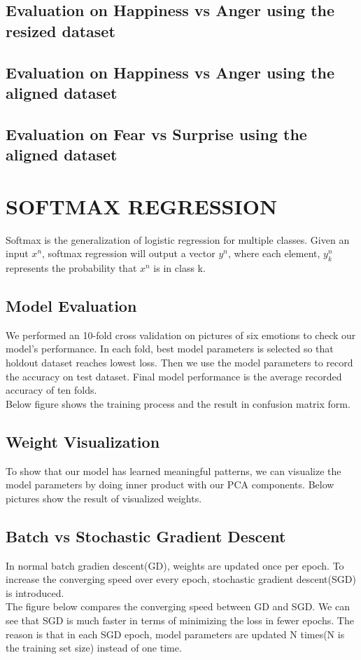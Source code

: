 \documentclass{article} %
\begin{document}
\subsection {Evaluation on Happiness vs Anger using the resized dataset}
\subsection {Evaluation on Happiness vs Anger using the aligned dataset}
\subsection {Evaluation on Fear vs Surprise using the aligned dataset}


\section{SOFTMAX REGRESSION}
Softmax is the generalization of logistic regression for multiple classes. Given an input $x^n$, softmax regression will output a vector $y^n$, where each element, $y_k^n$ represents the probability that $x^n$ is in class k.
\subsection {Model Evaluation}
We performed an 10-fold cross validation on pictures of six emotions to check our model's performance. In each fold, best model parameters is selected so that holdout dataset reaches lowest loss. Then we use the model parameters to record the accuracy on test dataset. Final model performance is the average recorded accuracy of ten folds. \\
Below figure shows the training process and the result in confusion matrix form.
\subsection {Weight Visualization}
To show that our model has learned meaningful patterns, we can visualize the model parameters by doing inner product with our PCA components. Below pictures show the result of visualized weights. 
\subsection {Batch vs Stochastic Gradient Descent}
In normal batch gradien descent(GD), weights are updated once per epoch. To increase the converging speed over every epoch, stochastic gradient descent(SGD) is introduced.\\
The figure below compares the converging speed between GD and SGD. We can see that SGD is much faster in terms of minimizing the loss in fewer epochs. The reason is that in each SGD epoch, model parameters are updated N times(N is the training set size) instead of one time.
\end{document}
